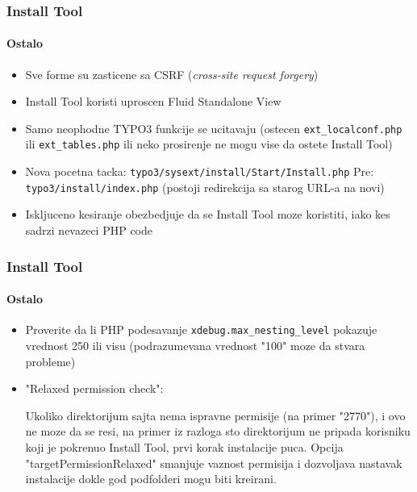 
\begin{frame}[fragile]
	\frametitle{Install Tool}
	\framesubtitle{Ostalo}

	\begin{itemize}
		\item Sve forme su zasticene sa CSRF (\textit{cross-site request forgery})
		\item Install Tool koristi uproscen Fluid Standalone View
		\item Samo neophodne TYPO3 funkcije se ucitavaju\newline
			(ostecen \texttt{ext\_localconf.php} ili \texttt{ext\_tables.php} ili neko prosirenje ne mogu vise da ostete Install Tool)
		\item Nova pocetna tacka:	\tabto{3.2cm} \texttt{typo3/sysext/install/Start/Install.php}\newline
			Pre:					\tabto{3.2cm} \texttt{typo3/install/index.php}\newline
									\tabto{3.2cm} (postoji redirekcija sa starog URL-a na novi)
		\item Iskljuceno kesiranje obezbedjuje da se Install Tool moze koristiti, iako kes sadrzi nevazeci PHP code
	\end{itemize}

\end{frame}


\begin{frame}[fragile]
	\frametitle{Install Tool}
	\framesubtitle{Ostalo}

	\begin{itemize}
		\item Proverite da li PHP podesavanje \texttt{xdebug.max\_nesting\_level} pokazuje vrednost 250 ili visu (podrazumevana vrednost "100" moze da stvara probleme)
		\item "Relaxed permission check":

			\small
				Ukoliko direktorijum sajta nema ispravne permisije (na primer "2770"),
				i ovo ne moze da se resi, na primer iz razloga sto direktorijum ne pripada 
				korisniku koji je pokrenuo Install Tool, prvi korak instalacije puca.
				Opcija "targetPermissionRelaxed" smanjuje vaznost permisija i dozvoljava
				nastavak instalacije dokle god podfolderi mogu biti kreirani.
			\normalsize

	\end{itemize}

\end{frame}

